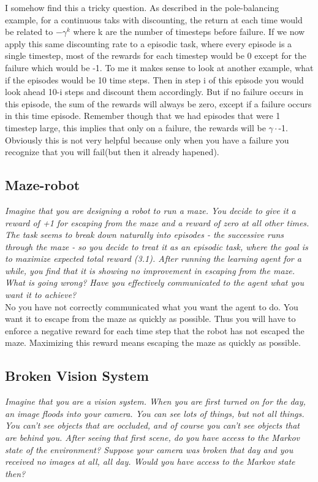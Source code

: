 \documentclass[12pt,a4paper]{article}
\begin{document}
I somehow find this a tricky question. As described in the pole-balancing example, for a continuous taks with discounting, the return at each time would be related to $-\gamma^k$ where k are the number of timesteps before failure. If we now apply this same discounting rate to a episodic task, where every episode is a single timestep, most of the rewards for each timestep would be 0 except for the failure which would be -1. To me it makes sense to look at another example, what if the episodes would be 10 time steps. Then in step i of this episode you would look ahead 10-i steps and discount them accordingly. But if no failure occurs in this episode, the sum of the rewards will always be zero, except if a failure occurs in this time episode. Remember though that we had episodes that were 1 timestep large, this implies that only on a failure, the rewards will be $\gamma\cdot$-1. Obviously this is not very helpful because only when you have a failure you recognize that you will fail(but then it already hapened). 

\subsection{Maze-robot}
\textit{Imagine that you are designing a robot to run a maze. You decide to give it a reward of +1 for escaping from the maze and a reward of zero at all other times. The task seems to break down naturally into episodes - the successive runs through the maze - so you decide to treat it as an episodic task, where the goal is to maximize expected total reward (3.1). After running the learning agent for a while, you find that it is showing no improvement in escaping from the maze. What is going wrong? Have you effectively communicated to the agent what you want it to achieve?}\\

No you have not correctly communicated what you want the agent to do. You want it to escape from the maze as quickly as possible. Thus you will have to enforce a negative reward for each time step that the robot has not escaped the maze. Maximizing this reward means escaping the maze as quickly as possible. 

\subsection{Broken Vision System}
\textit{Imagine that you are a vision system. When you are first turned on for the day, an image floods into your camera. You can see lots of things, but not all things. You can't see objects that are occluded, and of course you can't see objects that are behind you. After seeing that first scene, do you have access to the Markov state of the environment? Suppose your camera was broken that day and you received no images at all, all day. Would you have access to the Markov state then?}\\
\end{document}
